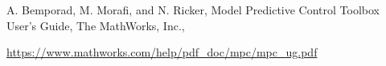 \documentclass[conference,11pt]{IEEEtran}
\begin{document}
\begin{thebibliography}{00}
	A. Bemporad, M. Morafi, and N. Ricker, Model Predictive Control Toolbox User’s Guide, The MathWorks, Inc.,
	
		\url{https://www.mathworks.com/help/pdf_doc/mpc/mpc_ug.pdf}
		
	
	
	
	
	
	
	
	
	
	
	
		
\end{thebibliography}
\end{document}

